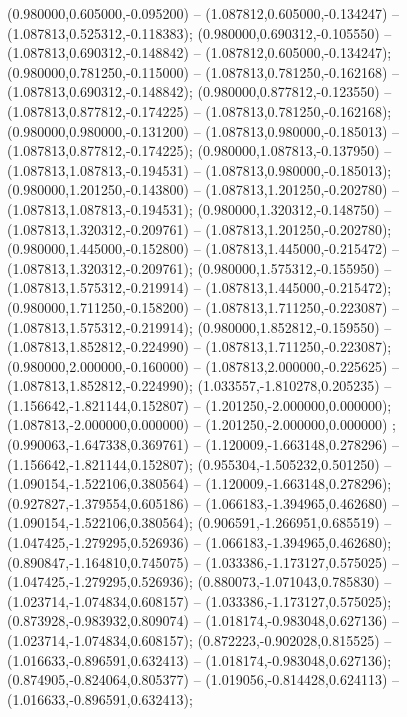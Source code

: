  (0.980000,0.605000,-0.095200) -- (1.087812,0.605000,-0.134247) -- (1.087813,0.525312,-0.118383);
 (0.980000,0.690312,-0.105550) -- (1.087813,0.690312,-0.148842) -- (1.087812,0.605000,-0.134247);
 (0.980000,0.781250,-0.115000) -- (1.087813,0.781250,-0.162168) -- (1.087813,0.690312,-0.148842);
 (0.980000,0.877812,-0.123550) -- (1.087813,0.877812,-0.174225) -- (1.087813,0.781250,-0.162168);
 (0.980000,0.980000,-0.131200) -- (1.087813,0.980000,-0.185013) -- (1.087813,0.877812,-0.174225);
 (0.980000,1.087813,-0.137950) -- (1.087813,1.087813,-0.194531) -- (1.087813,0.980000,-0.185013);
 (0.980000,1.201250,-0.143800) -- (1.087813,1.201250,-0.202780) -- (1.087813,1.087813,-0.194531);
 (0.980000,1.320312,-0.148750) -- (1.087813,1.320312,-0.209761) -- (1.087813,1.201250,-0.202780);
 (0.980000,1.445000,-0.152800) -- (1.087813,1.445000,-0.215472) -- (1.087813,1.320312,-0.209761);
 (0.980000,1.575312,-0.155950) -- (1.087813,1.575312,-0.219914) -- (1.087813,1.445000,-0.215472);
 (0.980000,1.711250,-0.158200) -- (1.087813,1.711250,-0.223087) -- (1.087813,1.575312,-0.219914);
 (0.980000,1.852812,-0.159550) -- (1.087813,1.852812,-0.224990) -- (1.087813,1.711250,-0.223087);
 (0.980000,2.000000,-0.160000) -- (1.087813,2.000000,-0.225625) -- (1.087813,1.852812,-0.224990);
 (1.033557,-1.810278,0.205235) -- (1.156642,-1.821144,0.152807) -- (1.201250,-2.000000,0.000000);
 (1.087813,-2.000000,0.000000) -- (1.201250,-2.000000,0.000000) ;
 (0.990063,-1.647338,0.369761) -- (1.120009,-1.663148,0.278296) -- (1.156642,-1.821144,0.152807);
 (0.955304,-1.505232,0.501250) -- (1.090154,-1.522106,0.380564) -- (1.120009,-1.663148,0.278296);
 (0.927827,-1.379554,0.605186) -- (1.066183,-1.394965,0.462680) -- (1.090154,-1.522106,0.380564);
 (0.906591,-1.266951,0.685519) -- (1.047425,-1.279295,0.526936) -- (1.066183,-1.394965,0.462680);
 (0.890847,-1.164810,0.745075) -- (1.033386,-1.173127,0.575025) -- (1.047425,-1.279295,0.526936);
 (0.880073,-1.071043,0.785830) -- (1.023714,-1.074834,0.608157) -- (1.033386,-1.173127,0.575025);
 (0.873928,-0.983932,0.809074) -- (1.018174,-0.983048,0.627136) -- (1.023714,-1.074834,0.608157);
 (0.872223,-0.902028,0.815525) -- (1.016633,-0.896591,0.632413) -- (1.018174,-0.983048,0.627136);
 (0.874905,-0.824064,0.805377) -- (1.019056,-0.814428,0.624113) -- (1.016633,-0.896591,0.632413);
